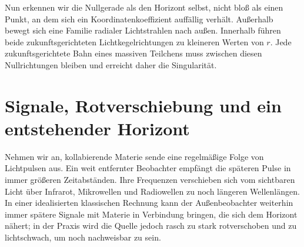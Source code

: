 Nun erkennen wir die Nullgerade als den Horizont selbst, nicht bloß als einen Punkt, an dem sich ein Koordinatenkoeffizient auffällig verhält. Außerhalb bewegt sich eine Familie radialer Lichtstrahlen nach außen. Innerhalb führen beide zukunftsgerichteten Lichtkegelrichtungen zu kleineren Werten von \(r\). Jede zukunftsgerichtete Bahn eines massiven Teilchens muss zwischen diesen Nullrichtungen bleiben und erreicht daher die Singularität.

\section{Signale, Rotverschiebung und ein entstehender Horizont}

Nehmen wir an, kollabierende Materie sende eine regelmäßige Folge von Lichtpulsen aus. Ein weit entfernter Beobachter empfängt die späteren Pulse in immer größeren Zeitabständen. Ihre Frequenzen verschieben sich vom sichtbaren Licht über Infrarot, Mikrowellen und Radiowellen zu noch längeren Wellenlängen. In einer idealisierten klassischen Rechnung kann der Außenbeobachter weiterhin immer spätere Signale mit Materie in Verbindung bringen, die sich dem Horizont nähert; in der Praxis wird die Quelle jedoch rasch zu stark rotverschoben und zu lichtschwach, um noch nachweisbar zu sein.

\begin{classroomqa}
\end{classroomqa}

\begin{classroomqa}
\end{classroomqa}

